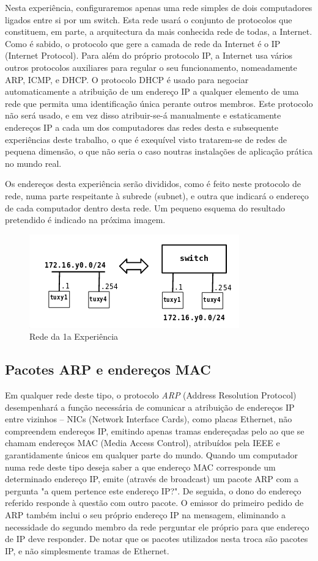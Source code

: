 \documentclass[a4paper,11pt,titlepage]{article}
\begin{document}
Nesta experiência, configuraremos apenas uma rede simples de dois computadores
ligados entre si por um switch. Esta rede usará o conjunto de protocolos que
constituem, em parte, a arquitectura da mais conhecida rede de todas, a
Internet. Como é sabido, o protocolo que gere a camada de rede da Internet é
o IP (Internet Protocol).  Para além do próprio protocolo IP, a Internet usa
vários outros protocolos auxiliares para regular o seu funcionamento,
nomeadamente ARP, ICMP, e DHCP.
O protocolo DHCP é usado para negociar automaticamente a atribuição de um
endereço IP a qualquer elemento de uma rede que permita uma identificação única
perante outros membros. Este protocolo não será usado, e em vez disso
atribuir-se-á manualmente e estaticamente endereços IP a cada um dos
computadores das redes desta e subsequente experiências deste trabalho, o que é
exequível visto tratarem-se de redes de pequena dimensão, o que não seria o
caso noutras instalações de aplicação prática no mundo real.

Os endereços desta experiência serão divididos, como é feito neste protocolo de
rede, numa parte respeitante à subrede (subnet), e outra que indicará o
endereço de cada computador dentro desta rede. Um pequeno esquema do resultado
pretendido é indicado na próxima imagem.

\begin{figure}[H]
    \center
    \includegraphics[scale=0.45]{res/network1.png}
    \caption{Rede da 1a Experiência}
    \label{fig:network1.png}
\end{figure}

\subsection{Pacotes ARP e endereços MAC}

Em qualquer rede deste tipo, o protocolo \emph{ARP} (Address Resolution Protocol)
desempenhará a função necessária de comunicar a atribuição de endereços IP
entre vizinhos -- NICs (Network Interface Cards), como placas Ethernet, não
compreendem endereços IP, emitindo apenas tramas endereçadas pelo ao que se
chamam endereços MAC (Media Access Control), atribuídos pela IEEE e
garantidamente únicos em qualquer parte do mundo. Quando um computador numa
rede deste tipo deseja saber a que endereço MAC corresponde um determinado
endereço IP, emite (através de broadcast) um pacote ARP com a pergunta "a quem
pertence este endereço IP?". De seguida, o dono do endereço referido responde à
questão com outro pacote. O emissor do primeiro pedido de ARP também inclui o
seu próprio endereço IP na mensagem, eliminando a necessidade do segundo membro
da rede perguntar ele próprio para que endereço de IP deve responder.
De notar que os pacotes utilizados nesta troca são pacotes IP, e não
simplesmente tramas de Ethernet.
\end{document}
